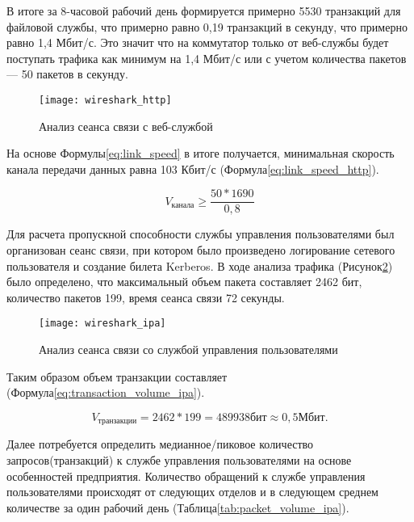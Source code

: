 \documentclass[14pt, a4paper]{extarticle}
\begin{document}
В итоге за 8-часовой рабочий день формируется примерно 5530 транзакций
для файловой службы, что примерно равно 0,19 транзакций в секунду, что
примерно равно 1,4 Мбит/с. Это значит что на коммутатор только от
веб-службы будет поступать трафика как минимум на 1,4 Мбит/с или
с учетом количества пакетов --- 50 пакетов в секунду.

\begin{figure}[H]
  \centering
  \texttt{[image: wireshark\_http]}
  \caption{Анализ сеанса связи с веб-службой}
  \label{fig:wireshark_http}
\end{figure}

На основе Формулы\;\ref{eq:link_speed} в итоге получается, минимальная
скорость канала передачи данных равна 103 Кбит/с
(Формула\;\ref{eq:link_speed_http}).

\begin{equation}\label{eq:link_speed_http}
  V_\text{канала} \geq \frac{50 * 1690}{0,8}
\end{equation}

Для расчета пропускной способности службы управления пользователями
был организован сеанс связи, при котором было произведено логирование
сетевого пользователя и создание билета Kerberos. В ходе анализа
трафика (Рисунок\;\ref{fig:wireshark_ipa}) было определено, что
максимальный объем пакета составляет 2462 бит, количество пакетов 199,
время сеанса связи 72 секунды.

\begin{figure}[H]
  \centering
  \texttt{[image: wireshark\_ipa]}
  \caption{Анализ сеанса связи со службой управления пользователями}
  \label{fig:wireshark_ipa}
\end{figure}

Таким образом объем транзакции составляет
(Формула\;\ref{eq:transaction_volume_ipa}).

\begin{equation}\label{eq:transaction_volume_ipa}
  V_\text{транзакции} = 2462 * 199 = 489938 \text{бит} \approx 0,5 \text{Мбит}.
\end{equation}


Далее потребуется определить медианное/пиковое количество
запросов(транзакций) к службе управления пользователями на основе
особенностей предприятия. Количество обращений к службе управления
пользователями происходят от следующих отделов и в следующем среднем
количестве за один рабочий день
(Таблица\;\ref{tab:packet_volume_ipa}).
\end{document}
